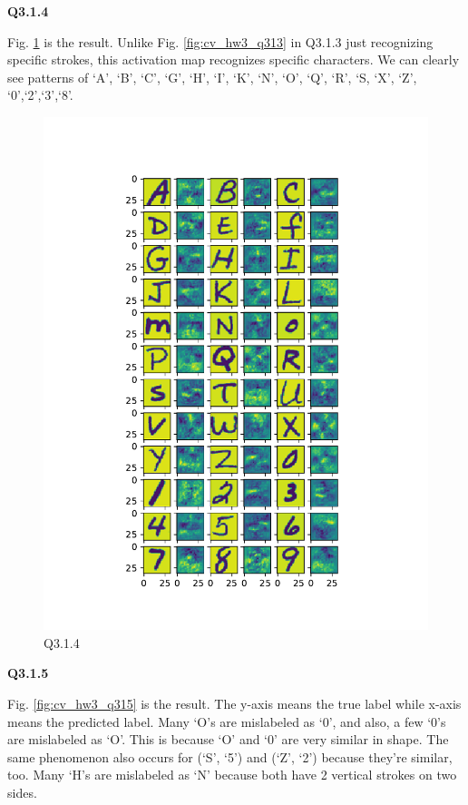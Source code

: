 \documentclass[
  course = {{16-720B Computer Vision}},
  quartile = {{1}},
  assignment = 3-Neural\ Networks\ for\ Recognition,
  name = {{Kangle Deng}},
  email = {{kangled@andrew.cmu.edu}},
  firstexercise = 1
]{aga-homework}
\begin{document}
\noindent \textbf{Q3.1.4}

Fig. \ref{fig:cv_hw3_q314} is the result. Unlike Fig. \ref{fig:cv_hw3_q313} in Q3.1.3 just recognizing specific strokes, this activation map recognizes specific characters. We can clearly see patterns of `A', `B', `C', `G', `H', `I', `K', `N', `O', `Q', `R', `S, `X', `Z', `0',`2',`3',`8'.

\begin{figure}
    \centering
    \includegraphics{CV/fig/hw3/q314.pdf}
    \caption{Q3.1.4}
    \label{fig:cv_hw3_q314}
\end{figure}

\noindent \textbf{Q3.1.5}

Fig. \ref{fig:cv_hw3_q315} is the result. The y-axis means the true label while x-axis means the predicted label. Many `O's are mislabeled as `0', and also, a few `0's are mislabeled as `O'. This is because `O' and `0' are very similar in shape. The same phenomenon also occurs for (`S', `5') and (`Z', `2') because they're similar, too. Many `H's are mislabeled as `N' because both have 2 vertical strokes on two sides. 
\end{document}
